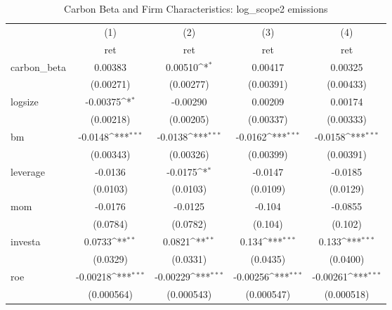 \begin{table}[htbp]\centering
\def\sym#1{\ifmmode^{#1}\else\(^{#1}\)\fi}
\caption{Carbon Beta and Firm Characteristics: log\_scope2 emissions}
\begin{tabular}{l*{4}{c}}
\hline\hline
                    &\multicolumn{1}{c}{(1)}&\multicolumn{1}{c}{(2)}&\multicolumn{1}{c}{(3)}&\multicolumn{1}{c}{(4)}\\
                    &\multicolumn{1}{c}{ret}&\multicolumn{1}{c}{ret}&\multicolumn{1}{c}{ret}&\multicolumn{1}{c}{ret}\\
\hline
carbon\_beta         &     0.00383         &     0.00510\sym{*}  &     0.00417         &     0.00325         \\
                    &   (0.00271)         &   (0.00277)         &   (0.00391)         &   (0.00433)         \\
[1em]
logsize             &    -0.00375\sym{*}  &    -0.00290         &     0.00209         &     0.00174         \\
                    &   (0.00218)         &   (0.00205)         &   (0.00337)         &   (0.00333)         \\
[1em]
bm                  &     -0.0148\sym{***}&     -0.0138\sym{***}&     -0.0162\sym{***}&     -0.0158\sym{***}\\
                    &   (0.00343)         &   (0.00326)         &   (0.00399)         &   (0.00391)         \\
[1em]
leverage            &     -0.0136         &     -0.0175\sym{*}  &     -0.0147         &     -0.0185         \\
                    &    (0.0103)         &    (0.0103)         &    (0.0109)         &    (0.0129)         \\
[1em]
mom                 &     -0.0176         &     -0.0125         &      -0.104         &     -0.0855         \\
                    &    (0.0784)         &    (0.0782)         &     (0.104)         &     (0.102)         \\
[1em]
investa             &      0.0733\sym{**} &      0.0821\sym{**} &       0.134\sym{***}&       0.133\sym{***}\\
                    &    (0.0329)         &    (0.0331)         &    (0.0435)         &    (0.0400)         \\
[1em]
roe                 &    -0.00218\sym{***}&    -0.00229\sym{***}&    -0.00256\sym{***}&    -0.00261\sym{***}\\
                    &  (0.000564)         &  (0.000543)         &  (0.000547)         &  (0.000518)         \\

\end{tabular}
\end{table}

